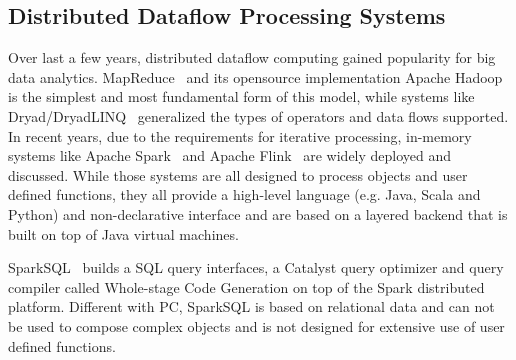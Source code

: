 \subsection{Distributed Dataflow Processing Systems}
Over last a few years, distributed dataflow computing gained
popularity for big
data analytics. MapReduce~\cite {dean2008mapreduce} and its opensource
implementation Apache Hadoop~\cite{white2009hadoop} is the simplest and
most fundamental form of this model, while systems like
Dryad/DryadLINQ~\cite{yu2008dryadlinq} generalized the types of operators and
data flows supported. In recent years, due to the requirements for
iterative processing, in-memory systems like
Apache Spark~\cite{zaharia2012resilient} and
Apache Flink~\cite{alexandrov2014stratosphere} are widely deployed and
discussed. While those systems are all designed to process objects and
user defined functions, they all provide a high-level language
(e.g. Java, Scala and Python) and non-declarative interface and are
based on a layered backend that is built on top of Java virtual machines.

SparkSQL~\cite{armbrust2015spark} builds a SQL query
interfaces, a Catalyst query optimizer and query compiler called Whole-stage Code Generation
on top of the Spark distributed platform. Different with PC, SparkSQL
is based on relational data and can not be used to compose complex
objects and is not designed for extensive use of user defined functions.





